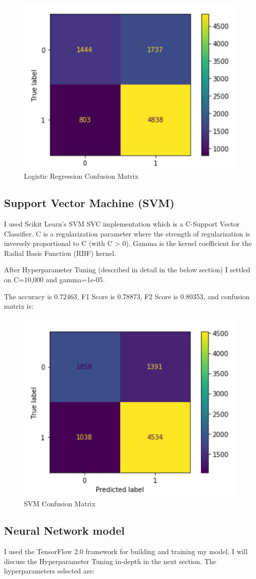\documentclass{article}
\begin{document}
\begin{figure}[ht!]
  \includegraphics[width=0.5\linewidth]{img/11.png}
  \centering
  \caption{Logistic Regression Confusion Matrix}
  \label{fig:11}
\end{figure}

\subsection*{Support Vector Machine (SVM)}
 I used Scikit Learn’s SVM SVC implementation which is a C-Support Vector Classifier. C is a regularization parameter where the strength of regularization is inversely proportional to C (with C > 0). Gamma is the kernel coefficient for the Radial Basis Function (RBF) kernel.
  
After Hyperparameter Tuning (described in detail in the below section) I settled on C=10,000 and gamma=1e-05.

The accuracy is 0.72463, F1 Score is 0.78873, F2 Score is 0.80353, and confusion matrix is:

\begin{figure}[ht!]
  \includegraphics[width=0.5\linewidth]{img/12.png}
  \centering
  \caption{SVM Confusion Matrix}
  \label{fig:12}
\end{figure}

\subsection*{Neural Network model} 
 I used the TensorFlow 2.0 framework for building and training my model.
 I will discuss the Hyperparameter Tuning in-depth in the next section. The hyperparameters selected are:\newline
 
\end{document}
